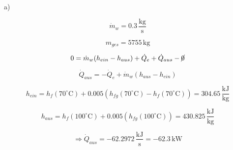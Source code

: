 a) 

\[
\dot{m}_w = 0.3 \, \frac{\text{kg}}{\text{s}}
\]

\[
m_{ges} = 5755 \, \text{kg}
\]

\[
0 = \dot{m}_w (h_{ein} - h_{aus}) + \dot{Q}_e + \dot{Q}_{aus} - \cancel{0}
\]

\[
\dot{Q}_{aus} = -\dot{Q}_e + \dot{m}_w (h_{aus} - h_{ein})
\]

\[
h_{ein} = h_f (70^\circ \text{C}) + 0.005 \left( h_{fg} (70^\circ \text{C}) - h_f (70^\circ \text{C}) \right) = 304.65 \, \frac{\text{kJ}}{\text{kg}}
\]

\[
h_{aus} = h_f (100^\circ \text{C}) + 0.005 \left( h_{fg} (100^\circ \text{C}) \right) = 430.825 \, \frac{\text{kJ}}{\text{kg}}
\]

\[
\Rightarrow \dot{Q}_{aus} = -62.2972 \, \frac{\text{kJ}}{\text{s}} = -62.3 \, \text{kW}
\]
